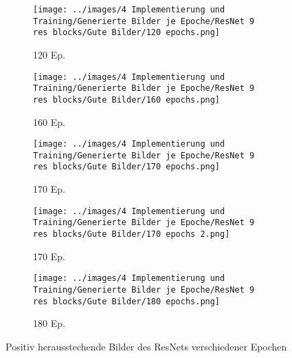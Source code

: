 \begin{figure}[H]
    \centering
    \begin{subfigure}[b]{0.12\textwidth}
        \centering
        \texttt{[image: ../images/4 Implementierung und Training/Generierte Bilder je Epoche/ResNet 9 res blocks/Gute Bilder/120 epochs.png]}
        \caption{120 Ep.}
    \end{subfigure}
    \hspace{3em}%
    \begin{subfigure}[b]{0.12\textwidth}
        \centering
        \texttt{[image: ../images/4 Implementierung und Training/Generierte Bilder je Epoche/ResNet 9 res blocks/Gute Bilder/160 epochs.png]}
        \caption{160 Ep.}
    \end{subfigure}
    \hspace{3em}%
    \begin{subfigure}[b]{0.12\textwidth}
        \centering
        \texttt{[image: ../images/4 Implementierung und Training/Generierte Bilder je Epoche/ResNet 9 res blocks/Gute Bilder/170 epochs.png]}
        \caption{170 Ep.}
    \end{subfigure}
    \hspace{3em}%
    \begin{subfigure}[b]{0.12\textwidth}
        \centering
        \texttt{[image: ../images/4 Implementierung und Training/Generierte Bilder je Epoche/ResNet 9 res blocks/Gute Bilder/170 epochs 2.png]}
        \caption{170 Ep.}
    \end{subfigure}
    \hspace{3em}%
    \begin{subfigure}[b]{0.12\textwidth}
    \centering
    \texttt{[image: ../images/4 Implementierung und Training/Generierte Bilder je Epoche/ResNet 9 res blocks/Gute Bilder/180 epochs.png]}
    \caption{180 Ep.}
\end{subfigure}
        \caption{Positiv herausstechende Bilder des ResNets verschiedener Epochen}
        \label{fig:resnet-gute-bilder}
\end{figure}

